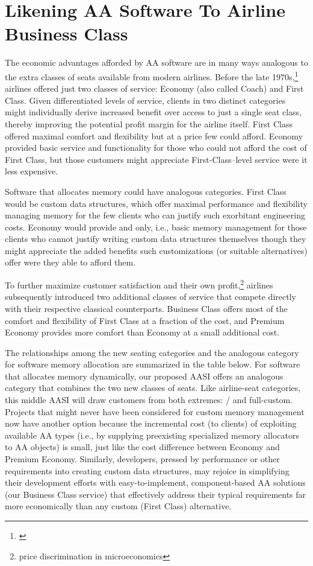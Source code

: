\appendix
\section{Likening AA Software To Airline Business Class}
The economic advantages afforded by AA software are in many ways analogous to
the extra classes of seats available from modern airlines. Before the late 1970s,\footnote{\cite{brancatelli12}}
airlines offered just two classes of service: Economy (also called Coach) and First
Class. Given differentiated levels of service, clients in two distinct categories might
individually derive increased benefit over access to just a single seat class, thereby
improving the potential profit margin for the airline itself. First Class offered
maximal comfort and flexibility but at a price few could afford. Economy provided
basic service and functionality for those who could not afford the cost of First Class,
but those customers might appreciate First-Class–level service were it less
expensive.

Software that allocates memory could have analogous categories. First Class would
be custom data structures, which offer maximal performance and flexibility
managing memory for the few clients who can justify such exorbitant engineering
costs. Economy would provide  and  only, i.e., basic memory
management for those clients who cannot justify writing custom data structures
themselves though they might appreciate the added benefits such customizations (or
suitable alternatives) offer were they able to afford them.

To further maximize customer satisfaction and their own profit,\footnote{price discrimination in microeconomics} airlines
subsequently introduced two additional classes of service that compete directly with
their respective classical counterparts. Business Class offers most of the comfort
and flexibility of First Class at a fraction of the cost, and Premium Economy
provides more comfort than Economy at a small additional cost.

The relationships among the new seating categories and the analogous category for
software memory allocation are summarized in the table below. For software that
allocates memory dynamically, our proposed AASI offers an analogous category that
combines the two new classes of seats. Like airline-seat categories, this middle AASI
will draw customers from both extremes: / and full-custom. Projects that
might never have been considered for custom memory management now have
another option because the incremental cost (to clients) of exploiting available AA
types (i.e., by supplying preexisting specialized memory allocators to AA objects) is
small, just like the cost difference between Economy and Premium Economy.
Similarly, developers, pressed by performance or other requirements into creating
custom data structures, may rejoice in simplifying their development efforts with
easy-to-implement, component-based AA solutions (our Business Class service) that
effectively address their typical requirements far more economically than any
custom (First Class) alternative.


